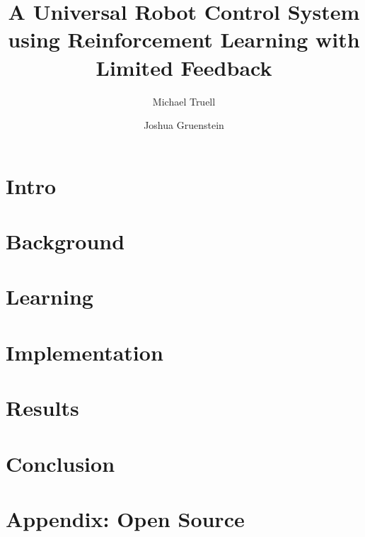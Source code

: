 \documentclass[letterpaper,11pt]{article}
\title{A Universal Robot Control System using Reinforcement Learning with Limited Feedback}
\author{Michael Truell \and Joshua Gruenstein}
\begin{document}
\maketitle



\pagebreak

\section{Intro}



\section{Background}



\section{Learning}



\section{Implementation}



\section{Results}



\section{Conclusion}



\nocite{*}

\pagebreak



\pagebreak

\section{Appendix: Open Source}


\end{document}
